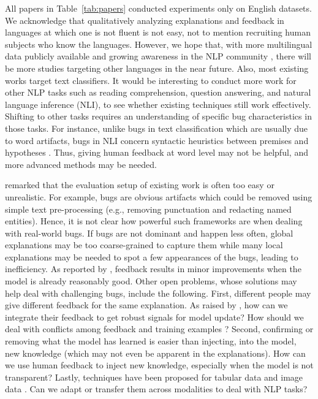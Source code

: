 All papers in Table~\ref{tab:papers} conducted experiments only on English datasets. 
We acknowledge that qualitatively analyzing explanations and feedback in languages at which one is not fluent is not easy, not to mention recruiting human subjects who know the languages.   
However, we hope that, with more multilingual data publicly available  and growing awareness in the NLP community , there will be more \EBHD studies targeting other languages in the near future.
Also, most existing \EBHD works target  
text classifiers. It would be interesting to conduct more \EBHD work for other NLP tasks such as reading comprehension, question answering, and natural language inference (NLI), to see whether existing techniques still work effectively. 
Shifting to other tasks requires an understanding of specific bug characteristics in those tasks.
For instance, unlike bugs in text classification which are usually due to word artifacts, bugs in NLI concern syntactic heuristics between premises and hypotheses . Thus, giving human feedback  
at word level may not be helpful, and more advanced methods may be needed.

 remarked that the evaluation setup of existing \EBHD work is often too easy or unrealistic. For example, bugs are obvious artifacts which could be removed using simple text pre-processing (e.g., removing punctuation and redacting named entities). 
Hence, it is not clear how powerful such \EBHD frameworks are when dealing with real-world  bugs. 
If bugs are not dominant and happen less often, global explanations may be too coarse-grained to capture them while 
many local explanations may be needed to spot a few appearances of the bugs, leading to inefficiency.
As reported by ,
feedback results in minor improvements when the model is already reasonably good. 
Other open problems, whose solutions may help deal with  
challenging bugs, include the following.
First, different people may give different feedback for the same explanation. As raised by , how can we integrate their feedback to get robust signals for model update? How should we deal with conflicts among feedback and training examples ?
Second, confirming or removing what the model has learned is easier than injecting, into the model, new knowledge (which may not even be apparent in the explanations). How can we use human feedback to inject new knowledge, especially when the model is not transparent?
Lastly, \EBHD techniques have been proposed for tabular data and image data . Can we adapt or transfer them across modalities to deal with NLP tasks?

